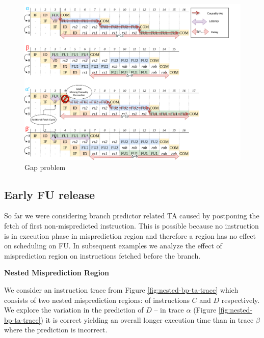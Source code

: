 \begin{figure}[H]
    \centering
    \includegraphics[width=\textwidth]{figures/gap-problem.png}
    \caption{Gap problem}
    \label{fig:gap-problem}
\end{figure}


\subsection{Early FU release}

So far we were considering branch predictor related TA caused by postponing the fetch of first non-mispredicted instruction.  This is possible because no instruction is in execution phase in misprediction region and therefore a region has no effect on scheduling on FU. In subsequent examples we analyze the effect of misprediction region on instructions fetched before the branch.

\begin{example}
\textbf{Nested Misprediction Region}

We consider an instruction trace from Figure \ref{fig:nested-bp-ta-trace} which consists of two nested misprediction regions: of instructions $C$ and $D$ respectively. We explore the variation in the prediction of $D$ -- in trace $\alpha$ (Figure \ref{fig:nested-bp-ta-trace}) it is correct yielding an overall longer execution time than in trace $\beta$ where the prediction is incorrect.
    
\label{ex:nested-bp-ta}
\end{example}


